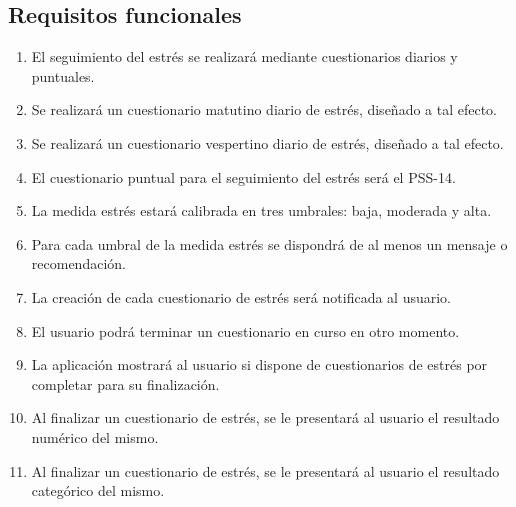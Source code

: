     \subsection{Requisitos funcionales}
        \label{req:especificos:funcionales}
        \begin{enumerate}[label=\textbf{\texttt{RF-\arabic*}}]
            \item El seguimiento del estrés se realizará mediante cuestionarios diarios y puntuales.
            \item Se realizará un cuestionario matutino diario de estrés, diseñado a tal efecto.
            \item Se realizará un cuestionario vespertino diario de estrés, diseñado a tal efecto.
            \item El cuestionario puntual para el seguimiento del estrés será el PSS-14.
            \item La medida estrés estará calibrada en tres umbrales: baja, moderada y alta.
            \item Para cada umbral de la medida estrés se dispondrá de al menos un mensaje o recomendación.
            \item La creación de cada cuestionario de estrés será notificada al usuario.
            \item El usuario podrá terminar un cuestionario en curso en otro momento.
            \item La aplicación mostrará al usuario si dispone de cuestionarios de estrés por completar para su finalización.
            \item Al finalizar un cuestionario de estrés, se le presentará al usuario el resultado numérico del mismo.
            \item Al finalizar un cuestionario de estrés, se le presentará al usuario el resultado categórico del mismo.
            

\end{enumerate}
